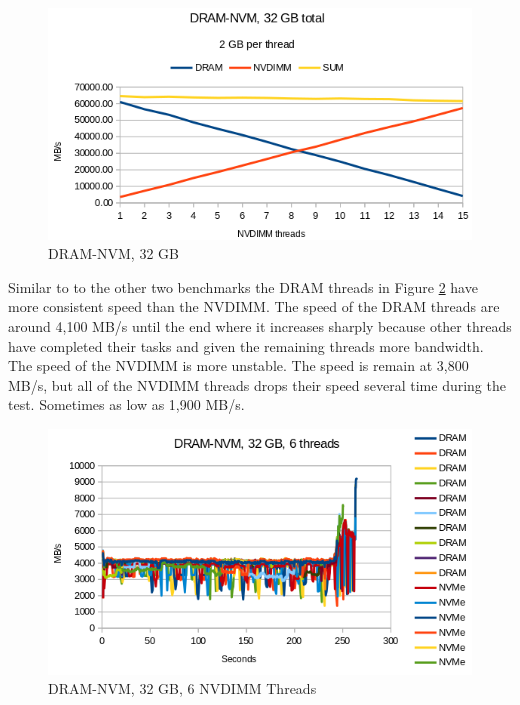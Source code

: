 \documentclass[12pt,a4paper,USenglish]{article}      %
\begin{document}
\begin{figure}[!hbtp]
\includegraphics[scale=0.7]{Benchmarks/DRAM-NVM_32GB_Figure.png}
\caption{DRAM-NVM, 32 GB}
\label{fig:DRAM_NVM}
\end{figure}
Similar to to the other two benchmarks the DRAM threads in Figure \ref{fig:DRAM_NVM_sec} have more consistent speed than the NVDIMM. The speed of the DRAM threads are around 4,100 MB/s until the end where it increases sharply because other threads have completed their tasks and given the remaining threads more bandwidth. The speed of the NVDIMM is more unstable. The speed is remain at 3,800 MB/s, but all of the NVDIMM threads drops their speed several time during the test. Sometimes as low as 1,900 MB/s.

\begin{figure}[!hbtp]
\includegraphics[scale=0.7]{Benchmarks/DRAM-NVM_32GB_6_Thread.png}
\caption{DRAM-NVM, 32 GB, 6 NVDIMM Threads}
\label{fig:DRAM_NVM_sec}
\end{figure}
\end{document}
